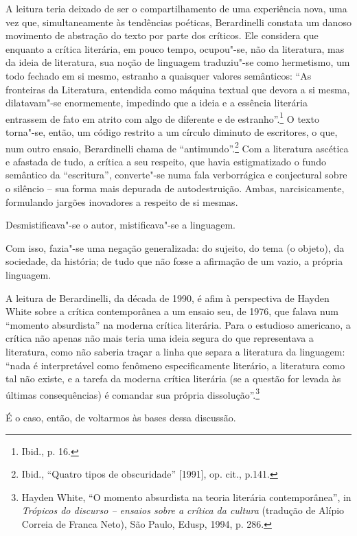 A leitura teria deixado de ser o compartilhamento de uma experiência
nova, uma vez que, simultaneamente às tendências poéticas, Berardinelli
constata um danoso movimento de abstração do texto por parte dos
críticos. Ele considera que enquanto a crítica literária, em pouco
tempo, ocupou"-se, não da literatura, mas da ideia de literatura, sua
noção de linguagem traduziu"-se como hermetismo, um todo fechado em si
mesmo, estranho a quaisquer valores semânticos: ``As fronteiras da
Literatura, entendida como máquina textual que devora a si mesma,
dilatavam"-se enormemente, impedindo que a ideia e a essência literária
entrassem de fato em atrito com algo de diferente e de
estranho''.\footnote{Ibid., p. 16.} O texto torna"-se, então, um código
restrito a um círculo diminuto de escritores, o que, num outro ensaio,
Berardinelli chama de ``antimundo''.\footnote{Ibid., ``Quatro tipos de
  obscuridade'' {[}1991{]}, op. cit., p.141.} Com a literatura ascética
e afastada de tudo, a crítica a seu respeito, que havia estigmatizado o
fundo semântico da ``escritura'', converte"-se numa fala verborrágica e
conjectural sobre o silêncio -- sua forma mais depurada de
autodestruição. Ambas, narcisicamente, formulando jargões inovadores a
respeito de si mesmas.

Desmistificava"-se o autor, mistificava"-se a linguagem.

Com isso, fazia"-se uma negação generalizada: do sujeito, do tema (o
objeto), da sociedade, da história; de tudo que não fosse a afirmação de
um vazio, a própria linguagem.

A leitura de Berardinelli, da década de 1990, é afim à perspectiva de
Hayden White sobre a crítica contemporânea a um ensaio seu, de 1976, que
falava num ``momento absurdista'' na moderna crítica literária. Para o
estudioso americano, a crítica não apenas não mais teria uma ideia
segura do que representava a literatura, como não saberia traçar a linha
que separa a literatura da linguagem: ``nada é interpretável como
fenômeno especificamente literário, a literatura como tal não existe, e
a tarefa da moderna crítica literária (se a questão for levada às
últimas consequências) é comandar sua própria dissolução''.\footnote{Hayden
  White, ``O momento absurdista na teoria literária contemporânea'', in
  \emph{Trópicos do discurso -- ensaios sobre a crítica da cultura}
  (tradução de Alípio Correia de Franca Neto), São Paulo, Edusp, 1994,
  p. 286.}

É o caso, então, de voltarmos às bases dessa discussão.

